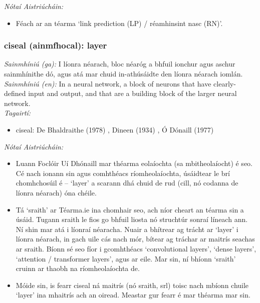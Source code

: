  \noindent \textit{Nótaí Aistriúcháin:}
\begin{itemize}
	\item Féach ar an téarma `link prediction (LP) / réamhinsint nasc (RN)'.
\end{itemize}


\subsubsection*{ciseal (ainmfhocal): layer}
 \noindent \textit{Sainmhíniú (ga):} I líonra néarach, bloc néaróg a bhfuil ionchur agus aschur sainmhínithe dó, agus atá mar chuid in-athúsáidte den líonra néarach iomlán.
\\
 \noindent \textit{Sainmhíniú (en):} In a neural network, a block of neurons that have clearly-defined input and output, and that are a building block of the larger neural network.
\\
 \noindent \textit{Tagairtí:}
\begin{itemize}
	\item ciseal: De Bhaldraithe (1978) \cite{de-bhaldraithe}, Dineen (1934) \cite{dineen}, Ó Dónaill (1977) \cite{odonaill}
\end{itemize}

 \noindent \textit{Nótaí Aistriúcháin:}
\begin{itemize}
	\item Luann Foclóir Uí Dhónaill mar théarma eolaíochta (sa mbitheolaíocht) é seo. Cé nach ionann sin agus comhthéacs ríomheolaíochta, úsáidtear le brí chomhchosúil é -- `layer' a scarann dhá chuid de rud (cill, nó codanna de líonra néarach) óna chéile.
	\item Tá `sraith' ar Téarma.ie ina chomhair seo, ach níor cheart an téarma sin a úsáid. Tugann sraith le fios go bhfuil liosta nó struchtúr sonraí líneach ann. Ní shin mar atá i líonraí néaracha. Nuair a bhítrear ag trácht ar `layer' i líonra néarach, in gach uile cás nach mór, bítear ag tráchar ar maitrís seachas ar sraith. Bíonn sé seo fíor i gcomhthéacs `convolutional layers', `dense layers', `attention / transformer layers', agus ar eile. Mar sin, ní bhíonn `sraith' cruinn ar thaobh na ríomheolaíochta de.
	\item Móide sin, is fearr ciseal ná maitrís (nó sraith, srl) toisc nach mbíonn chuile `layer' ina mhaitrís ach an oiread. Meastar gur fearr é mar théarma mar sin.
\end{itemize}


